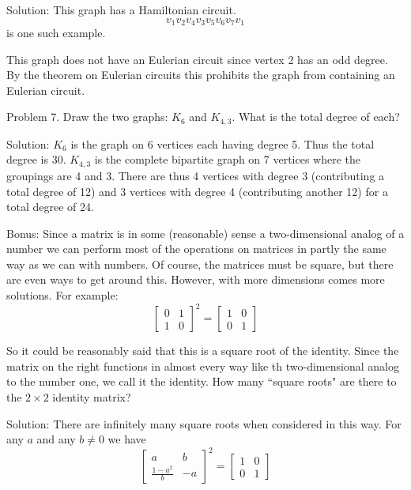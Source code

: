 \documentclass[16 pt]{amsart}
\theoremstyle{definition}
\theoremstyle{remark}
\numberwithin{equation}{subsection}
\begin{document}
\vspace{1in}

Solution: This graph has a Hamiltonian circuit.
\[
v_1 v_2 v_4 v_3 v_5 v_6 v_7 v_1
\]
is one such example.


This graph does not have an Eulerian circuit since vertex 2 has an odd degree.  By the theorem on Eulerian circuits this prohibits the 
graph from containing an Eulerian circuit.

\newpage

Problem 7. Draw the two graphs: $K_6$ and $K_{4,3}$.  What is the total degree of each?

\vspace{1in}

Solution: $K_6$ is the graph on 6 vertices each having degree 5.  Thus the total degree is 30. $K_{4,3}$ is the complete bipartite graph on 7 vertices where the groupings are 4 and 3.  There are thus 4 vertices with degree 3 (contributing a total degree of 12) and 3 vertices with degree 4 (contributing another 12) for a total degree of 24.


\newpage

Bonus: Since a matrix is in some (reasonable) sense a two-dimensional analog of a number we can perform most of the operations on matrices in partly the same way as we can with numbers.  Of course, the matrices must be square, but there are even ways to get around this.  However, with more dimensions comes more solutions.  For example:
\[
\begin{bmatrix}
0&1\\1&0
\end{bmatrix}^2 = \begin{bmatrix}
1 & 0\\ 0 & 1
\end{bmatrix}
\]

So it could be reasonably said that this is a square root of the identity.  Since the matrix on the right functions in almost every way like th two-dimensional analog to the number one, we call it the identity.  How many ``square roots" are there to the $2\times 2$ identity matrix?

\vspace{1in}

Solution: There are infinitely many square roots when considered in this way.  For any $a$ and any $b\ne 0$ we have
\[
\begin{bmatrix}
a & b \\
\frac{1-a^2}{b} & -a
\end{bmatrix}^2 = \begin{bmatrix}
1&0\\0&1
\end{bmatrix}
\]
\end{document}
